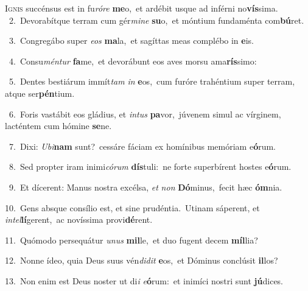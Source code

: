 \lettrine{\initial\textcolor{\initialcolor}{I}}{gnis} succénsus est in fu\-\textit{ró}\-\textit{re} \textbf{me}\-o,~\star et ardébit usque ad inférni no\-\textbf{vís}\-sima.\\
{\numbfont\textcolor{\numbcolor}{~2.}}~Devorabítque terram cum gér\-\textit{mi}\-\textit{ne} \textbf{su}\-o,~\star et móntium fundaménta com\-\textbf{bú}\-ret.\par
{\numbfont\textcolor{\numbcolor}{~3.}}~Congregábo super \textit{e}\-\textit{os} \textbf{ma}\-la,~\star et sagíttas meas complébo in \textbf{e}\-is.\par
{\numbfont\textcolor{\numbcolor}{~4.}}~Consu\-\textit{mén}\-\textit{tur} \textbf{fa}\-me,~\star et devorábunt eos aves morsu ama\-\textbf{rís}\-simo:\par
{\numbfont\textcolor{\numbcolor}{~5.}}~Dentes bestiárum immít\textit{tam} \textit{in} \textbf{e}\-os,~\star cum furóre trahéntium super terram, atque ser\-\textbf{pén}\-tium.\par
{\numbfont\textcolor{\numbcolor}{~6.}}~Foris vastábit eos gládius, et \textit{in}\-\textit{tus} \textbf{pa}\-vor,~\star júvenem simul ac vírginem, lacténtem cum hómine \textbf{se}\-ne.\par
{\numbfont\textcolor{\numbcolor}{~7.}}~Dixi: \textit{U}\-\textit{bi}\textbf{nam} sunt?~\star cessáre fáciam ex homínibus memóriam e\-\textbf{ó}\-rum.\par
{\numbfont\textcolor{\numbcolor}{~8.}}~Sed propter iram inimi\-\textit{có}\-\textit{rum} \textbf{dís}\-tuli:~\star ne forte superbírent hostes e\-\textbf{ó}\-rum.\par
{\numbfont\textcolor{\numbcolor}{~9.}}~Et dícerent: Manus nostra excélsa, \textit{et} \textit{non} \textbf{Dó}\-minus,~\star fecit hæc \textbf{óm}\-nia.\par
{\numbfont\textcolor{\numbcolor}{10.}}~Gens absque consílio est, et sine prudéntia.~\dagger Utinam sáperent, et \textit{in}\-\textit{tel}\textbf{lí}gerent,~\star ac novíssima provi\-\textbf{dé}\-rent.\par
{\numbfont\textcolor{\numbcolor}{11.}}~Quómodo persequátur \textit{u}\-\textit{nus} \textbf{mil}\-le,~\star et duo fugent decem \textbf{míl}\-lia?\par
{\numbfont\textcolor{\numbcolor}{12.}}~Nonne ídeo, quia Deus suus vén\-\textit{di}\-\textit{dit} \textbf{e}\-os,~\star et Dóminus conclúsit \textbf{il}\-los?\par
{\numbfont\textcolor{\numbcolor}{13.}}~Non enim est Deus noster ut di\textit{i} \textit{e}\-\textbf{ó}rum:~\star et inimíci nostri sunt \textbf{jú}\-dices.\par
